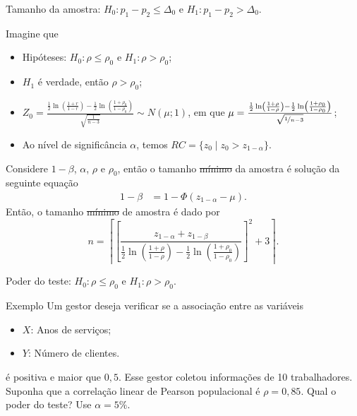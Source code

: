 \documentclass[9pt]{beamer}
\begin{document}
\begin{frame}{Tamanho da amostra: $H_0:p_1 - p_2 \leq \Delta_0$ e $H_1: p_1 - p_2 > \Delta_0$.}

\normalsize
Imagine que
\begin{itemize}
	\item Hipóteses: $H_0:\rho \leq \rho_0$ e $H_1: \rho > \rho_0$;
	\item $H_1$ é verdade, então $\rho > \rho_0$;
	\item $Z_0 = \frac{\frac{1}{2} \ln\left( \frac{1 + r}{1 - r} \right) - \frac{1}{2} \ln\left( \frac{1 + \rho_0}{1 - \rho_0} \right)}{\sqrt{\frac{1}{n-3}}} \sim N\left( \mu; 1 \right)$, em que $\mu = \frac{ \frac{1}{2} \ln\left( \frac{1 + \rho}{1 - \rho} \right) -\frac{1}{2} \ln\left( \frac{1 + \rho_0}{1 - \rho_0} \right)  }{\sqrt{\nicefrac{1}{n-3}}}$;
	\item Ao nível de significância $\alpha$, temos $RC = \{ z_0 \mid z_0 > z_{1 - \alpha}   \}$.
\end{itemize}
\vfill

Considere $1-\beta$, $\alpha$, $\rho$ e $\rho_0$, então o tamanho \sout{mínimo} da amostra é solução da seguinte equação
\begin{align*}
1-\beta &= 1 - \Phi\left( z_{1-\alpha} - \mu \right).
\end{align*}
Então, o tamanho \sout{mínimo} de amostra é dado por
$$n = \left\lceil \left[\frac{z_{1-\alpha} + z_{1-\beta} }{ \frac{1}{2} \ln \left( \frac{1 + \rho}{1 - \rho} \right) - \frac{1}{2} \ln \left( \frac{1 + \rho_0}{1 - \rho_0} \right) }\right]^2 + 3 \right\rceil. $$
\normalsize

 \end{frame}

\begin{frame}{Poder do teste: $H_0:\rho \leq \rho_0$ e $H_1: \rho > \rho_0$.}

\begin{block}{Exemplo}
	Um gestor deseja verificar se a associação entre as variáveis
	\begin{itemize}
		\item $X$: Anos de serviços;
		\item $Y$: Número de clientes.
	\end{itemize}
	é  positiva e maior que $0,5$. Esse gestor coletou informações de 10 trabalhadores. Suponha que a correlação linear de Pearson populacional é $\rho=0,85$. Qual o poder do teste? Use $\alpha=5\%$. 
\end{block}

\end{frame}
\end{document}
